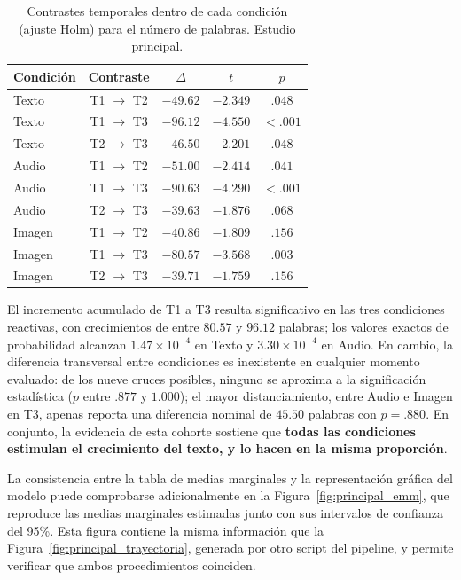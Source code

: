 \documentclass[12pt]{article}
\begin{document}
	\begin{table}[htbp] 
		\centering 
		\caption{Contrastes temporales dentro de cada condición (ajuste Holm) para el número de palabras. Estudio principal.} 
		\label{tab:contrastes_tiempo} 
		\begin{tabular}{l c c c c} 
			\toprule 
			Condición & Contraste & $\Delta$ & $t$ & $p$ \\ 
			\midrule 
			Texto  & T1 $\to$ T2 & $-49.62$ & $-2.349$ & $.048$ \\ 
			Texto  & T1 $\to$ T3 & $-96.12$ & $-4.550$ & $\mathbf{< .001}$ \\ 
			Texto  & T2 $\to$ T3 & $-46.50$ & $-2.201$ & $.048$ \\ 
			\midrule 
			Audio  & T1 $\to$ T2 & $-51.00$ & $-2.414$ & $.041$ \\ 
			Audio  & T1 $\to$ T3 & $-90.63$ & $-4.290$ & $\mathbf{< .001}$ \\ 
			Audio  & T2 $\to$ T3 & $-39.63$ & $-1.876$ & $.068$ \\ 
			\midrule 
			Imagen & T1 $\to$ T2 & $-40.86$ & $-1.809$ & $.156$ \\ 
			Imagen & T1 $\to$ T3 & $-80.57$ & $-3.568$ & $\mathbf{.003}$ \\ 
			Imagen & T2 $\to$ T3 & $-39.71$ & $-1.759$ & $.156$ \\ 
			\bottomrule 
		\end{tabular} 
	\end{table} 
	
	El incremento acumulado de T1 a T3 resulta significativo en las tres condiciones reactivas, con crecimientos de entre $80.57$ y $96.12$ palabras; los valores exactos de probabilidad alcanzan $1.47 \times 10^{-4}$ en Texto y $3.30 \times 10^{-4}$ en Audio. En cambio, la diferencia transversal entre condiciones es inexistente en cualquier momento evaluado: de los nueve cruces posibles, ninguno se aproxima a la significación estadística ($p$ entre $.877$ y $1.000$); el mayor distanciamiento, entre Audio e Imagen en T3, apenas reporta una diferencia nominal de $45.50$ palabras con $p = .880$. En conjunto, la evidencia de esta cohorte sostiene que \textbf{todas las condiciones estimulan el crecimiento del texto, y lo hacen en la misma proporción}.
	
	La consistencia entre la tabla de medias marginales y la representación gráfica del modelo puede comprobarse adicionalmente en la Figura~\ref{fig:principal_emm}, que reproduce las medias marginales estimadas junto con sus intervalos de confianza del 95\%. Esta figura contiene la misma información que la Figura~\ref{fig:principal_trayectoria}, generada por otro script del pipeline, y permite verificar que ambos procedimientos coinciden.
	
\end{document}
